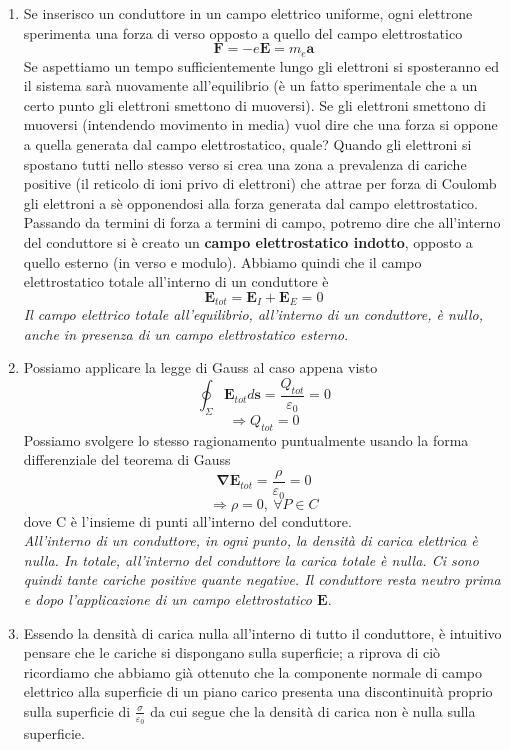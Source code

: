 \documentclass[10pt,a4paper]{article}
\begin{document}
\begin{enumerate}
\item	Se inserisco un conduttore in un campo elettrico uniforme, ogni elettrone sperimenta una forza di verso opposto a quello del campo elettrostatico
\[\mathbf{F} = -e\mathbf{E} = m_e \mathbf{a}\]
Se aspettiamo un tempo sufficientemente lungo gli elettroni si sposteranno ed il sistema sarà nuovamente all'equilibrio (è un fatto sperimentale che a un certo punto gli elettroni smettono di muoversi). Se gli elettroni smettono di muoversi (intendendo movimento in media) vuol dire che una forza si oppone a quella generata dal campo elettrostatico, quale? Quando gli elettroni si spostano tutti nello stesso verso si crea una zona a prevalenza di cariche positive (il reticolo di ioni privo di elettroni) che attrae per forza di Coulomb gli elettroni a sè opponendosi alla forza generata dal campo elettrostatico. Passando da termini di forza a termini di campo, potremo dire che all'interno del conduttore si è creato un \textbf{campo elettrostatico indotto}, opposto a quello esterno (in verso e modulo). Abbiamo quindi che il campo elettrostatico totale all'interno di un conduttore è
\[\mathbf{E}_{tot} = \mathbf{E}_I+\mathbf{E}_E = 0\]
\textit{Il campo elettrico totale all'equilibrio, all'interno di un conduttore, è nullo, anche in presenza di un campo elettrostatico esterno}.
\item Possiamo applicare la legge di Gauss al caso appena visto 
\[\oint_{\Sigma}\mathbf{E}_{tot}d\mathbf{s}= \frac{Q_{tot}}{\varepsilon_0} = 0\]
\[\Rightarrow Q_{tot} = 0\]
Possiamo svolgere lo stesso ragionamento puntualmente usando la forma differenziale del teorema di Gauss
\[\mathbf{\nabla}\mathbf{E}_{tot}=\frac{\rho}{\varepsilon_0}=0 \]
\[\Rightarrow \rho = 0,\ \forall P \in C\]
dove C è l'insieme di punti all'interno del conduttore. \\
\textit{All'interno di un conduttore, in ogni punto, la densità di carica elettrica è nulla. In totale, all'interno del conduttore la carica totale è nulla. Ci sono quindi tante cariche positive quante negative. Il conduttore resta neutro prima e dopo l'applicazione di un campo elettrostatico $\mathbf{E}$}.
\item Essendo la densità di carica nulla all'interno di tutto il conduttore, è intuitivo pensare che le cariche si dispongano sulla superficie; a riprova di ciò ricordiamo che abbiamo già ottenuto che la componente normale di campo elettrico alla superficie di un piano carico presenta una discontinuità proprio sulla superficie di \(\frac{\sigma}{\varepsilon_0}\) da cui segue che la densità di carica non è nulla sulla superficie. \\

\end{enumerate}
\end{document}

